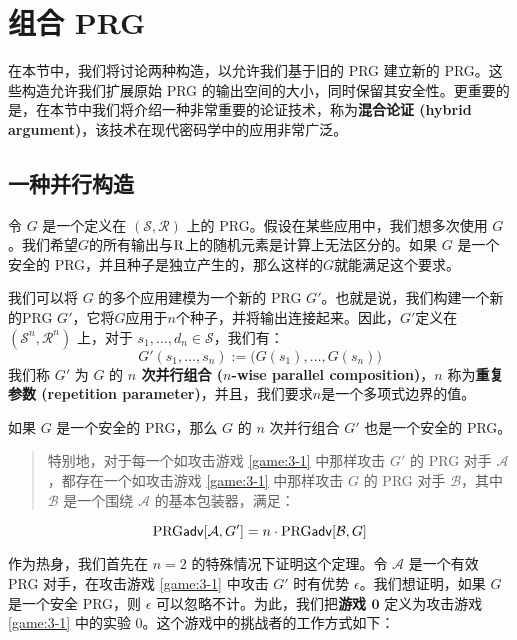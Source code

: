 \section{组合 PRG}

在本节中，我们将讨论两种构造，以允许我们基于旧的 PRG 建立新的 PRG。这些构造允许我们扩展原始 PRG 的输出空间的大小，同时保留其安全性。更重要的是，在本节中我们将介绍一种非常重要的论证技术，称为\textbf{混合论证 (hybrid argument)}，该技术在现代密码学中的应用非常广泛。

\subsection{一种并行构造}\label{subsec:3-4-1}

令 $G$ 是一个定义在 $(\mathcal S,\mathcal R)$ 上的 PRG。假设在某些应用中，我们想多次使用 $G$。我们希望$G$的所有输出与$\mathcal{\rm R}$上的随机元素是计算上无法区分的。如果 $G$ 是一个安全的 PRG，并且种子是独立产生的，那么这样的$G$就能满足这个要求。

我们可以将 $G$ 的多个应用建模为一个新的 PRG $G'$。也就是说，我们构建一个新的PRG $G'$，它将$G$应用于$n$个种子，并将输出连接起来。因此，$G'$定义在 $(\mathcal S^n,\mathcal R^n)$ 上，对于 $s_1,\dots,d_n\in\mathcal S$，我们有：
\[
G'(s_1,\dots,s_n):=\big(G(s_1),\dots,G(s_n)\big)
\]
我们称 $G'$ 为 $G$ 的 \textbf{$n$ 次并行组合 ($n$-wise parallel composition)}，$n$ 称为\textbf{重复参数 (repetition parameter)}，并且，我们要求$n$是一个多项式边界的值。

\begin{theorem}\label{theo:3-2}
如果 $G$ 是一个安全的 PRG，那么 $G$ 的 $n$ 次并行组合 $G'$ 也是一个安全的 PRG。
\begin{quote}
特别地，对于每一个如攻击游戏 \ref{game:3-1} 中那样攻击 $G'$ 的 PRG 对手 $\mathcal A$，都存在一个如攻击游戏 \ref{game:3-1} 中那样攻击 $G$ 的 PRG 对手 $\mathcal B$，其中 $\mathcal B$ 是一个围绕 $\mathcal A$ 的基本包装器，满足：
\end{quote}
\[
{\rm PRG\mathsf{adv}}[\mathcal{A},G']=n\cdot{\rm PRG\mathsf{adv}}[\mathcal{B},G]
\]
\end{theorem}

作为热身，我们首先在 $n=2$ 的特殊情况下证明这个定理。令 $\mathcal A$ 是一个有效 PRG 对手，在攻击游戏 \ref{game:3-1} 中攻击 $G'$ 时有优势 $\epsilon$。我们想证明，如果 $G$ 是一个安全 PRG，则 $\epsilon$ 可以忽略不计。为此，我们把\textbf{游戏 $\mathbf{0}$} 定义为攻击游戏 \ref{game:3-1} 中的实验 $0$。这个游戏中的挑战者的工作方式如下：

\vspace*{5pt}

